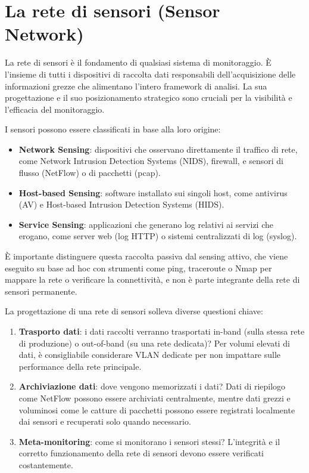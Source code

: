 \section{La rete di sensori (Sensor Network)}

La rete di sensori è il fondamento di qualsiasi sistema di monitoraggio.
È l'insieme di tutti i dispositivi di raccolta dati responsabili
dell'acquisizione delle informazioni grezze che alimentano l'intero
framework di analisi. La sua progettazione e il suo posizionamento
strategico sono cruciali per la visibilità e l'efficacia del monitoraggio.

I sensori possono essere classificati in base alla loro origine:

\begin{itemize}
\item \textbf{Network Sensing}: dispositivi che osservano direttamente
il traffico di rete, come Network Intrusion Detection Systems (NIDS),
firewall, e sensori di flusso (NetFlow) o di pacchetti (pcap).
\item \textbf{Host-based Sensing}: software installato sui singoli host,
come antivirus (AV) e Host-based Intrusion Detection Systems (HIDS).
\item \textbf{Service Sensing}: applicazioni che generano log relativi
ai servizi che erogano, come server web (log HTTP) o sistemi
centralizzati di log (syslog).
\end{itemize}

È importante distinguere questa raccolta passiva dal sensing attivo,
che viene eseguito su base ad hoc con strumenti come ping, traceroute
o Nmap per mappare la rete o verificare la connettività,
e non è parte integrante della rete di sensori permanente.

La progettazione di una rete di sensori solleva diverse questioni chiave:

\begin{enumerate}
\item \textbf{Trasporto dati}: i dati raccolti verranno trasportati
in-band (sulla stessa rete di produzione) o out-of-band
(su una rete dedicata)? Per volumi elevati di dati, è consigliabile
considerare VLAN dedicate per non impattare sulle performance
della rete principale.
\item \textbf{Archiviazione dati}: dove vengono memorizzati i dati?
Dati di riepilogo come NetFlow possono essere archiviati centralmente,
mentre dati grezzi e voluminosi come le catture di pacchetti possono
essere registrati localmente dai sensori e recuperati solo quando necessario.
\item \textbf{Meta-monitoring}: come si monitorano i sensori stessi?
L'integrità e il corretto funzionamento della rete di sensori
devono essere verificati costantemente.
\end{enumerate}

